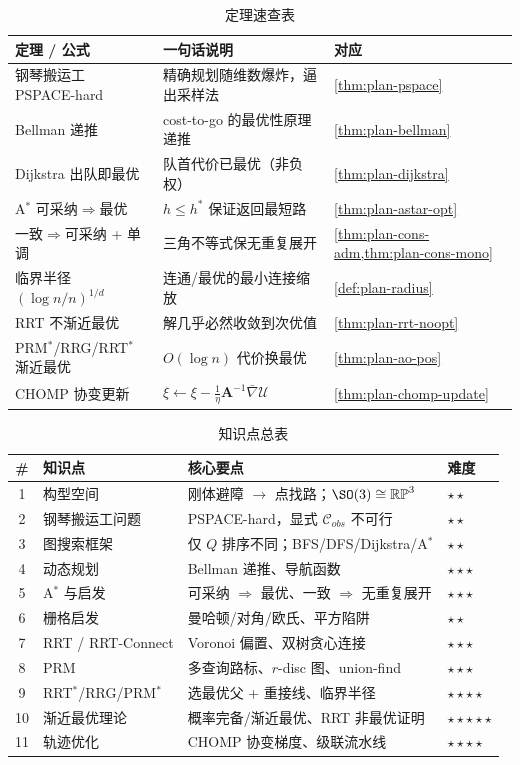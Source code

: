 \begin{table}[H]\centering\small
\caption{定理速查表}
\begin{tabular}{lll}
\toprule
定理 / 公式 & 一句话说明 & 对应 \\
\midrule
钢琴搬运工 PSPACE-hard & 精确规划随维数爆炸，逼出采样法 & \cref{thm:plan-pspace} \\
Bellman 递推 & cost-to-go 的最优性原理递推 & \cref{thm:plan-bellman} \\
Dijkstra 出队即最优 & 队首代价已最优（非负权） & \cref{thm:plan-dijkstra} \\
A$^*$ 可采纳$\Rightarrow$最优 & $h\le h^*$ 保证返回最短路 & \cref{thm:plan-astar-opt} \\
一致$\Rightarrow$可采纳 + 单调 & 三角不等式保无重复展开 & \cref{thm:plan-cons-adm,thm:plan-cons-mono} \\
临界半径 $(\log n/n)^{1/d}$ & 连通/最优的最小连接缩放 & \cref{def:plan-radius} \\
RRT 不渐近最优 & 解几乎必然收敛到次优值 & \cref{thm:plan-rrt-noopt} \\
PRM$^*$/RRG/RRT$^*$ 渐近最优 & $O(\log n)$ 代价换最优 & \cref{thm:plan-ao-pos} \\
CHOMP 协变更新 & $\xi\leftarrow\xi-\tfrac1\eta\mathbf{A}^{-1}\bar\nabla\mathcal{U}$ & \cref{thm:plan-chomp-update} \\
\bottomrule
\end{tabular}
\end{table}

\begin{table}[H]\centering\small
\caption{知识点总表}
\begin{tabular}{clll}
\toprule
\# & 知识点 & 核心要点 & 难度 \\
\midrule
1 & 构型空间 & 刚体避障 $\to$ 点找路；$\SO(3)\cong\mathbb{RP}^3$ & \(\star\star\) \\
2 & 钢琴搬运工问题 & PSPACE-hard，显式 $\mathcal{C}_{obs}$ 不可行 & \(\star\star\) \\
3 & 图搜索框架 & 仅 $Q$ 排序不同；BFS/DFS/Dijkstra/A$^*$ & \(\star\star\) \\
4 & 动态规划 & Bellman 递推、导航函数 & \(\star\star\star\) \\
5 & A$^*$ 与启发 & 可采纳 $\Rightarrow$ 最优、一致 $\Rightarrow$ 无重复展开 & \(\star\star\star\) \\
6 & 栅格启发 & 曼哈顿/对角/欧氏、平方陷阱 & \(\star\star\) \\
7 & RRT / RRT-Connect & Voronoi 偏置、双树贪心连接 & \(\star\star\star\) \\
8 & PRM & 多查询路标、$r$-disc 图、union-find & \(\star\star\star\) \\
9 & RRT$^*$/RRG/PRM$^*$ & 选最优父 + 重接线、临界半径 & \(\star\star\star\star\) \\
10 & 渐近最优理论 & 概率完备/渐近最优、RRT 非最优证明 & \(\star\star\star\star\star\) \\
11 & 轨迹优化 & CHOMP 协变梯度、级联流水线 & \(\star\star\star\star\) \\
\bottomrule
\end{tabular}
\end{table}

